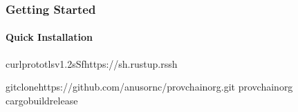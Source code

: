 \documentclass[letterpaper,10pt,english]{sphinxmanual}
\begin{document}
\subsubsection{Getting Started}
\label{\detokenize{user-guide/introduction:getting-started}}

\paragraph{Quick Installation}
\label{\detokenize{user-guide/introduction:quick-installation}}
\begin{sphinxVerbatim}[commandchars=\\\{\}]
curl\PYGZhy{}\PYGZhy{}proto\PYGZhy{}\PYGZhy{}tlsv1.2\PYGZhy{}sSfhttps://sh.rustup.rssh

gitclonehttps://github.com/anusornc/provchain\PYGZhy{}org.git
provchain\PYGZhy{}org
cargobuild\PYGZhy{}\PYGZhy{}release
\end{sphinxVerbatim}
\end{document}
